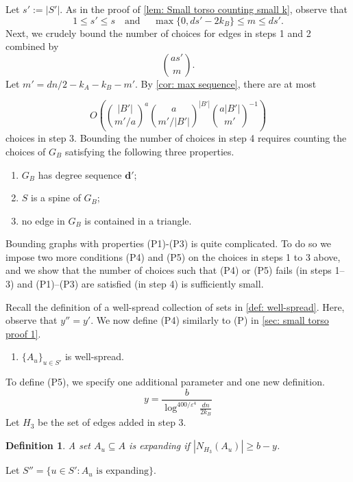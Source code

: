 \documentclass[11pt]{article}
\theoremstyle{plain}
\newtheorem{definition}[thm]{Definition}
\begin{document}
Let $s' := |S'|$.
    As in the proof of \cref{lem: Small torso counting small k}, observe that
    \begin{equation}\label{eq: mS' relaxed}
       1 \leq s' \leq s \quad\text{and } \quad  \max\{0, ds' - 2k_B\} \leq m \leq ds'.
    \end{equation}
Next, we crudely bound the number of choices for edges in steps 1 and 2 combined by 
\begin{equation}\label{eq: steps 1 and 2}
    \binom{as'}{m}.
\end{equation} 
Let $m' = dn/2 - k_A - k_B - m'$. By \cref{cor: max sequence}, there are at most 

\begin{equation}\label{eq: step 3}
    O\left(\binom{|B'|}{m'/a}^{a}\binom{a}{m'/|B'|}^{|B'|}\binom{a|B'|}{m'}^{-1}\right)
\end{equation}
choices in step 3. Bounding the number of choices in step 4 requires counting the choices of $G_B$ satisfying the following three properties.
\begin{enumerate}
    \item[(P1)] $G_B$ has degree sequence ${\mathbf d}'$;
    \item[(P2)] $S$ is a spine of $G_B$;
    \item[(P3)] no edge in $G_B$ is contained in a triangle.
\end{enumerate}
Bounding graphs with properties (P1)-(P3) is quite complicated. To do so we impose two more conditions (P4) and (P5) on the choices in steps 1 to 3 above, and we show that the number of choices such that (P4) or (P5) fails (in steps 1--3) and (P1)--(P3) are satisfied (in step 4) is sufficiently small. 

Recall the definition of a well-spread collection of sets in \cref{def: well-spread}. Here, observe that $y'' = y'$. We now define (P4) similarly to (P) in \cref{sec: small torso proof 1}.

\begin{enumerate}
    \item[(P4)] $\{A_u\}_{u\in S'}$ is well-spread. 
\end{enumerate}

To define (P5), we specify one additional parameter and one new definition.
\begin{equation}
    y = \frac{b}{\log^{400/\varepsilon^4}\frac{dn}{2k_B}}
\end{equation}
Let $H_3$ be the set of edges added in step 3.
\begin{definition}
    A set $A_u \subseteq A$ is \textit{expanding} if $|N_{H_3}(A_u)| \geq b - y$.
\end{definition}
Let $S'' = \{u \in S' \mathrel : A_u \text{ is expanding}\}$. 
\end{document}
